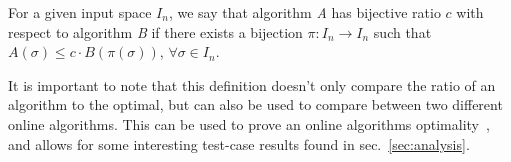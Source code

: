 \begin{definition}
    \label{def:bij}
    For a given input space $I_n$, we say that algorithm \textit{A} has bijective ratio $c$ with respect to algorithm \textit{B} if there exists a bijection $\pi:I_n \rightarrow I_n$ such that $A(\sigma) \leq c\cdot B(\pi(\sigma))$, $\forall \sigma \in I_n$. 
\end{definition}

It is important to note that this definition doesn't only compare the ratio of an algorithm to the optimal, but can also be used to compare between two different online algorithms. This can be used to prove an online algorithms optimality~\cite{bij2016}, and allows for some interesting test-case results found in sec.~\ref{sec:analysis}.